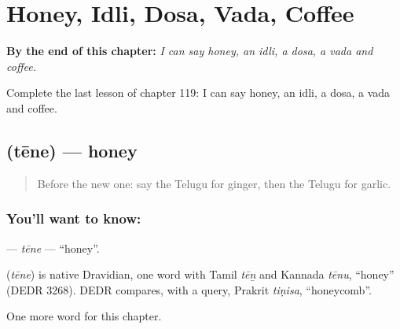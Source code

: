 
\chapter{Honey, Idli, Dosa, Vada, Coffee}
\label{ch:te-honey-idli-dosa-vada-coffee}

\begin{chapteropening}
\textbf{By the end of this chapter:} \emph{I can say honey, an idli, a dosa, a vada and coffee.}

Complete the last lesson of chapter 119: I can say honey, an idli, a dosa, a vada and coffee.
\end{chapteropening}

\section[\texorpdfstring{\te{తేనె} (tēne)}{తేనె (tēne)}]{ (tēne) — honey}

\label{lesson:TE-C119-tene}



\begin{quote}
Before the new one: say the Telugu for ginger, then the Telugu for garlic.
\end{quote}

\subsection*{You'll want to know: }
\textbf{} — \emph{tēne} — \textquotedblleft{}honey\textquotedblright{}.

\begin{cousinweb}
\textbf{} (\emph{tēne}) is native Dravidian, one word with Tamil \emph{tēṉ} and Kannada \emph{tēnu}, \textquotedblleft{}honey\textquotedblright{} (DEDR 3268). DEDR compares, with a query, Prakrit \emph{tiṇisa}, \textquotedblleft{}honeycomb\textquotedblright{}.
\end{cousinweb}

\begin{grammarlens}[title={What you've built}]
One more word for this chapter.
\end{grammarlens}

